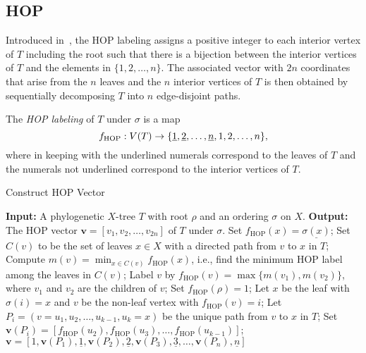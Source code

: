 \documentclass{article}
\newcommand{\HOP}{\mathrm{HOP}}
\newcommand{\ul}{\underline}
\begin{document}
\subsection{HOP} 
Introduced in~\cite{hop}, the HOP labeling assigns a positive integer to each interior vertex of $T$ including the root such that there is a bijection between the interior vertices of $T$ and the elements in $\{1,2,\ldots,n\}$. The associated vector with $2n$ coordinates that arise from the $n$ leaves and the $n$ interior vertices of $T$ is then obtained by sequentially decomposing $T$ into $n$ edge-disjoint paths.

The {\em HOP labeling} of $T$ under $\sigma$ is a map
$$f_{\rm HOP}: V(T)\rightarrow \{\underline{1}, \underline{2}, \ldots, \underline{n}, 1, 2, \ldots, n\},$$
where in keeping with \cite{hop} the underlined numerals correspond to the leaves of $T$ and the numerals not underlined correspond to the interior vertices of $T$. 


\begin{algorithm}[H]
    \caption{{\sc Construct HOP Vector}}
    \begin{algorithmic} [1]
       \STATE \textbf{Input:} A phylogenetic $X$-tree $T$ with root $\rho$ and an ordering $\sigma$ on $X$.
       \STATE \textbf{Output:} The HOP vector $\mathbf{v}=[v_1, v_2, \ldots, v_{2n}]$ of $T$ under $\sigma$.
            \STATE Set $f_\HOP(x) = \underline{\sigma(x)}$;
        \ENDFOR
            \STATE Set $C(v)$ to be the set of leaves $x\in X$ with a directed path from $v$ to $x$ in $T$;
            \STATE  Compute $m(v) = \min_{x \in C(v)} f_\HOP(x)$, i.e., find the minimum HOP label among the leaves in $C(v)$;
       \ENDFOR
            \STATE Label $v$ by $f_\HOP(v) = \max\{ m(v_1), m(v_2)\}$, where $v_1$ and $v_2$ are the children of $v$; 
        \ENDFOR
        \STATE Set $f_\HOP(\rho)=1$;
        \STATE Let $x$ be the leaf with $\sigma(i)=x$ and $v$ be the non-leaf vertex with $f_\HOP(v)=i$;
        \STATE Let 
        $P_i=(v=u_1, u_2, \ldots, u_{k-1}, u_k=x)$ be the unique path from $v$ to $x$ in $T$;
        \STATE Set $\mathbf{v}(P_i) = [ f_\HOP(u_2),f_\HOP(u_3), \ldots, f_\HOP(u_{k-1})]$;
    \ENDFOR
    \RETURN $\mathbf{v} = [1, \mathbf{v}(P_1), \ul{1}, \mathbf{v}(P_2), \ul{2}, \mathbf{v}(P_3), \ul{3}, \ldots, \mathbf{v}(P_n),\ul{n}]$ \label{abbreviation}
    \end{algorithmic}
    \label{alg:hop}
\end{algorithm}
\end{document}
